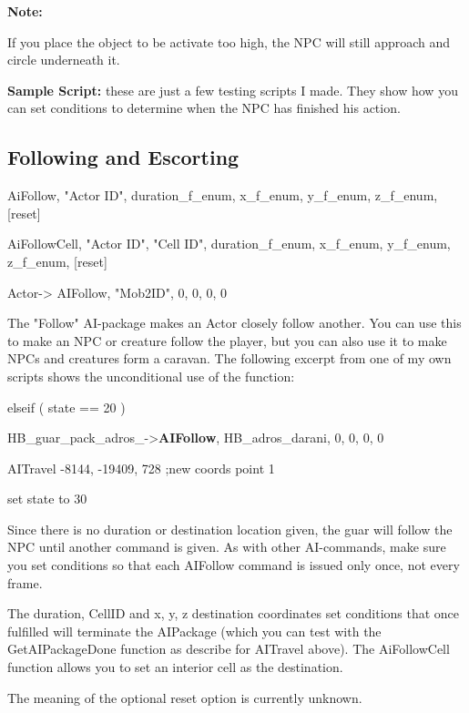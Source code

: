 \textbf{Note:}

If you place the object to be activate too high, the NPC will still
approach and circle underneath it.

\textbf{Sample Script:} these are just a few testing scripts I made.
They show how you can set conditions to determine when the NPC has
finished his action.







\hypertarget{following-and-escorting}{%
\subsection{Following and Escorting}\label{following-and-escorting}}

AiFollow, "Actor ID", duration\_f\_enum, x\_f\_enum, y\_f\_enum,
z\_f\_enum, {[}reset{]}

AiFollowCell, "Actor ID", "Cell ID", duration\_f\_enum, x\_f\_enum,
y\_f\_enum, z\_f\_enum, {[}reset{]}

Actor-> AIFollow, "Mob2ID", 0, 0, 0, 0

The "Follow" AI-package makes an Actor closely follow another. You can
use this to make an NPC or creature follow the player, but you can also
use it to make NPCs and creatures form a caravan. The following excerpt
from one of my own scripts shows the unconditional use of the function:

elseif ( state == 20 )

HB\_guar\_pack\_adros\_->\textbf{AIFollow},
HB\_adros\_darani, 0, 0, 0, 0

AITravel -8144, -19409, 728 ;new coords point 1

set state to 30

Since there is no duration or destination location given, the guar will
follow the NPC until another command is given. As with other
AI-commands, make sure you set conditions so that each AIFollow command
is issued only once, not every frame.

The duration, CellID and x, y, z destination coordinates set conditions
that once fulfilled will terminate the AIPackage (which you can test
with the GetAIPackageDone function as describe for AITravel above). The
AiFollowCell function allows you to set an interior cell as the
destination.

The meaning of the optional reset option is currently unknown.

